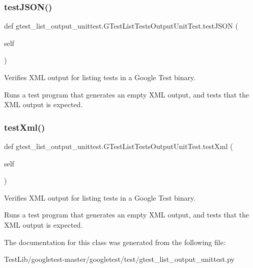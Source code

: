 \subsubsection{\texorpdfstring{test\+J\+S\+O\+N()}{testJSON()}}
{\footnotesize\ttfamily def gtest\+\_\+list\+\_\+output\+\_\+unittest.\+G\+Test\+List\+Tests\+Output\+Unit\+Test.\+test\+J\+S\+ON (\begin{DoxyParamCaption}\item[{}]{self }\end{DoxyParamCaption})}

\begin{DoxyVerb}Verifies XML output for listing tests in a Google Test binary.

Runs a test program that generates an empty XML output, and
tests that the XML output is expected.
\end{DoxyVerb}
 \mbox{\label{classgtest__list__output__unittest_1_1GTestListTestsOutputUnitTest_ad3088bc8ee3a0abdabbf1b90507e272e}} 
\subsubsection{\texorpdfstring{test\+Xml()}{testXml()}}
{\footnotesize\ttfamily def gtest\+\_\+list\+\_\+output\+\_\+unittest.\+G\+Test\+List\+Tests\+Output\+Unit\+Test.\+test\+Xml (\begin{DoxyParamCaption}\item[{}]{self }\end{DoxyParamCaption})}

\begin{DoxyVerb}Verifies XML output for listing tests in a Google Test binary.

Runs a test program that generates an empty XML output, and
tests that the XML output is expected.
\end{DoxyVerb}
 

The documentation for this class was generated from the following file\+:\begin{DoxyCompactItemize}
\item 
Test\+Lib/googletest-\/master/googletest/test/gtest\+\_\+list\+\_\+output\+\_\+unittest.\+py\end{DoxyCompactItemize}
